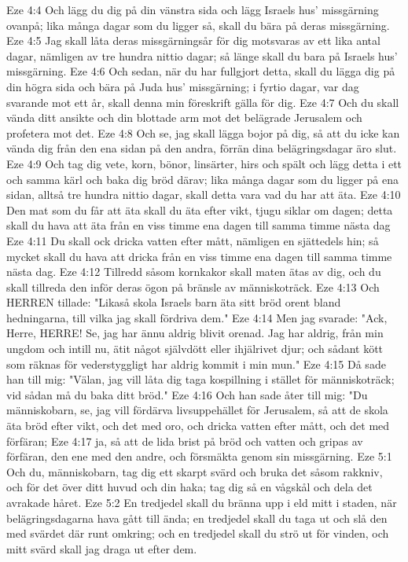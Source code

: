 Eze 4:4  Och lägg du dig på din vänstra sida och lägg Israels hus' missgärning ovanpå; lika många dagar som du ligger så, skall du bära på deras missgärning.
Eze 4:5  Jag skall låta deras missgärningsår för dig motsvaras av ett lika antal dagar, nämligen av tre hundra nittio dagar; så länge skall du bara på Israels hus' missgärning.
Eze 4:6  Och sedan, när du har fullgjort detta, skall du lägga dig på din högra sida och bära på Juda hus' missgärning; i fyrtio dagar, var dag svarande mot ett år, skall denna min föreskrift gälla för dig.
Eze 4:7  Och du skall vända ditt ansikte och din blottade arm mot det belägrade Jerusalem och profetera mot det.
Eze 4:8  Och se, jag skall lägga bojor på dig, så att du icke kan vända dig från den ena sidan på den andra, förrän dina belägringsdagar äro slut.
Eze 4:9  Och tag dig vete, korn, bönor, linsärter, hirs och spält och lägg detta i ett och samma kärl och baka dig bröd därav; lika många dagar som du ligger på ena sidan, alltså tre hundra nittio dagar, skall detta vara vad du har att äta.
Eze 4:10  Den mat som du får att äta skall du äta efter vikt, tjugu siklar om dagen; detta skall du hava att äta från en viss timme ena dagen till samma timme nästa dag
Eze 4:11  Du skall ock dricka vatten efter mått, nämligen en sjättedels hin; så mycket skall du hava att dricka från en viss timme ena dagen till samma timme nästa dag.
Eze 4:12  Tillredd såsom kornkakor skall maten ätas av dig, och du skall tillreda den inför deras ögon på bränsle av människoträck.
Eze 4:13  Och HERREN tillade: "Likaså skola Israels barn äta sitt bröd orent bland hedningarna, till vilka jag skall fördriva dem."
Eze 4:14  Men jag svarade: "Ack, Herre, HERRE! Se, jag har ännu aldrig blivit orenad. Jag har aldrig, från min ungdom och intill nu, ätit något självdött eller ihjälrivet djur; och sådant kött som räknas för vederstyggligt har aldrig kommit i min mun."
Eze 4:15  Då sade han till mig: "Välan, jag vill låta dig taga kospillning i stället för människoträck; vid sådan må du baka ditt bröd."
Eze 4:16  Och han sade åter till mig: "Du människobarn, se, jag vill fördärva livsuppehället för Jerusalem, så att de skola äta bröd efter vikt, och det med oro, och dricka vatten efter mått, och det med förfäran;
Eze 4:17  ja, så att de lida brist på bröd och vatten och gripas av förfäran, den ene med den andre, och försmäkta genom sin missgärning.
Eze 5:1  Och du, människobarn, tag dig ett skarpt svärd och bruka det såsom rakkniv, och för det över ditt huvud och din haka; tag dig så en vågskål och dela det avrakade håret.
Eze 5:2  En tredjedel skall du bränna upp i eld mitt i staden, när belägringsdagarna hava gått till ända; en tredjedel skall du taga ut och slå den med svärdet där runt omkring; och en tredjedel skall du strö ut för vinden, och mitt svärd skall jag draga ut efter dem.
